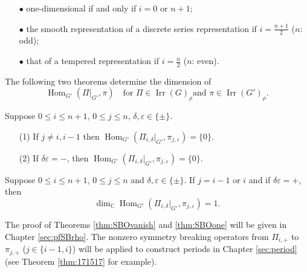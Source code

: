 \begin{enumerate}
\item[$\bullet$]
one-dimensional 
 if and only if $i=0$ or $n+1$;

\item[$\bullet$]
 the smooth representation of a discrete series representation 
 if $i=\frac{n+1}{2}$
 ($n$: odd);

\item[$\bullet$]
 that of a tempered representation
 if $i=\frac n 2$
 ($n$: even).  
\end{enumerate}


The following two theorems determine
 the dimension of
\[
  {\operatorname{Hom}}_{G'}(\Pi|_{G'},\pi)
\quad
\text{for $\Pi \in {\operatorname{Irr}}(G)_{\rho}$
      and $\pi \in {\operatorname{Irr}}(G')_{\rho}$.
}
\]

\begin{theorem}
[vanishing]
\label{thm:SBOvanish}
Suppose $0 \le i \le n+1$, $0 \le j \le n$, 
 $\delta, \varepsilon \in \{\pm\}$.  
\begin{enumerate}
\item[{\rm{(1)}}]
If $j \not = i, i-1$ then
$
  {\operatorname{Hom}}_{G'}(\Pi_{i,\delta}|_{G'}, \pi_{j,\varepsilon})=\{0\}. 
$

\item[{\rm{(2)}}] 
If $\delta \varepsilon =-$, 
 then 
$ 
{\operatorname{Hom}}_{G'}(\Pi_{i,\delta}|_{G'}, \pi_{j,\varepsilon}) =\{0\}.  
$ 
\end{enumerate}
\end{theorem}


\begin{theorem} 
\label{thm:SBOone}
Suppose $0 \le i \le n+1$, $0 \le j \le n$
 and $\delta, \varepsilon \in \{\pm\}$.  
If $j=i-1$ or $i$
 and if $\delta \varepsilon =+$, 
 then 
\[
   \dim_{\mathbb{C}}
   {\operatorname{Hom}}_{G'}
   (\Pi_{i,\delta}|_{G'}, \pi_{j,\varepsilon}) =1.  
\]
\end{theorem}

The proof of Theorems \ref{thm:SBOvanish} and \ref{thm:SBOone}
 will be given in Chapter \ref{sec:pfSBrho}.  
The nonzero symmetry breaking operators from 
 $\Pi_{i,+}$ to $\pi_{j,+}$ ($j \in \{i-1,i\}$) will be applied 
 to construct
 periods 
 in Chapter \ref{sec:period}
 (see Theorem \ref{thm:171517} for example).  



